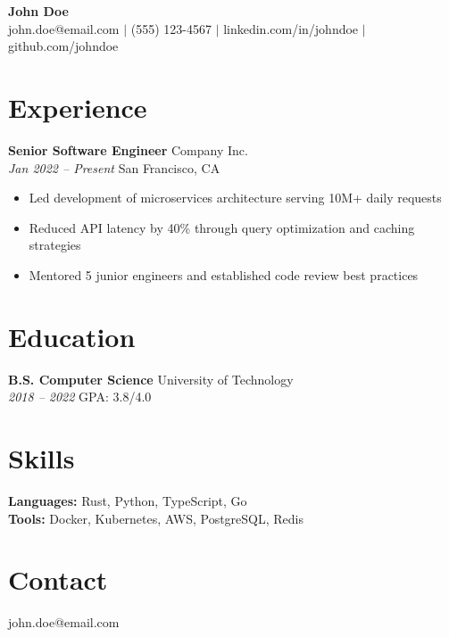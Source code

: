 \documentclass[11pt,a4paper]{article}
\begin{document}
\begin{center}
{\LARGE \textbf{John Doe}} \\
\vspace{2mm}
john.doe@email.com $|$ (555) 123-4567 $|$ linkedin.com/in/johndoe $|$ github.com/johndoe
\end{center}

\section*{Experience}
\textbf{Senior Software Engineer} \hfill Company Inc. \\
\textit{Jan 2022 -- Present} \hfill San Francisco, CA
\begin{itemize}[leftmargin=*,nosep]
  \item Led development of microservices architecture serving 10M+ daily requests
  \item Reduced API latency by 40\% through query optimization and caching strategies
  \item Mentored 5 junior engineers and established code review best practices
\end{itemize}

\section*{Education}
\textbf{B.S. Computer Science} \hfill University of Technology \\
\textit{2018 -- 2022} \hfill GPA: 3.8/4.0

\section*{Skills}
\textbf{Languages:} Rust, Python, TypeScript, Go \\
\textbf{Tools:} Docker, Kubernetes, AWS, PostgreSQL, Redis

\section*{Contact}
john.doe@email.com
\end{document}
